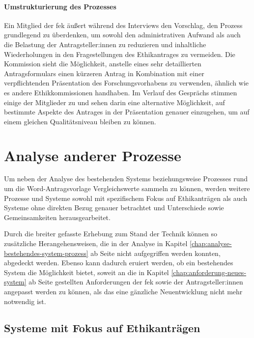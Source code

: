\documentclass[a4paper,12pt,twoside]{scrreprt}
\begin{document}
\subsubsection*{Umstrukturierung des Prozesses}
\label{sub-sub-sec:umstrukturierung-prozess}

Ein Mitglied der \ac{fek} äußert während des Interviews den Vorschlag, den Prozess grundlegend zu überdenken, um sowohl den administrativen Aufwand als auch die Belastung der Antragsteller:innen zu reduzieren und inhaltliche Wiederholungen in den Fragestellungen des Ethikantrages zu vermeiden. Die Kommission sieht die Möglichkeit, anstelle eines sehr detaillierten Antragsformulars einen kürzeren Antrag in Kombination mit einer verpflichtenden Präsentation des Forschungsvorhabens zu verwenden, ähnlich wie es andere Ethikkommissionen handhaben. Im Verlauf des Gesprächs stimmen einige der Mitglieder zu und sehen darin eine alternative Möglichkeit, auf bestimmte Aspekte des Antrages in der Präsentation genauer einzugehen, um auf einem gleichen Qualitätsniveau bleiben zu können.

\cleardoublepage
\chapter{Analyse anderer Prozesse}
\label{chap:analyse-anderer-prozesse}

Um neben der Analyse des bestehenden Systems beziehungsweise Prozesses rund um die Word-Antragsvorlage Vergleichswerte sammeln zu können, werden weitere Prozesse und Systeme sowohl mit spezifischem Fokus auf Ethikanträgen als auch Systeme ohne direkten Bezug genauer betrachtet und Unterschiede sowie Gemeinsamkeiten herausgearbeitet.

Durch die breiter gefasste Erhebung zum Stand der Technik können so zusätzliche Herangehensweisen, die in der Analyse in Kapitel \ref{chap:analyse-bestehendes-system-prozess} ab Seite \pageref{chap:analyse-bestehendes-system-prozess} nicht aufgegriffen werden konnten, abgedeckt werden. Ebenso kann dadurch eruiert werden, ob ein bestehendes System die Möglichkeit bietet, soweit an die in Kapitel \ref{chap:anforderung-neues-system} ab Seite \pageref{chap:anforderung-neues-system} gestellten Anforderungen der \acl{fek} sowie der Antragsteller:innen angepasst werden zu können, als das eine gänzliche Neuentwicklung nicht mehr notwendig ist.

\section{Systeme mit Fokus auf Ethikanträgen}
\label{sec:systeme-mit-fokkus-ethikantrage}
\end{document}

